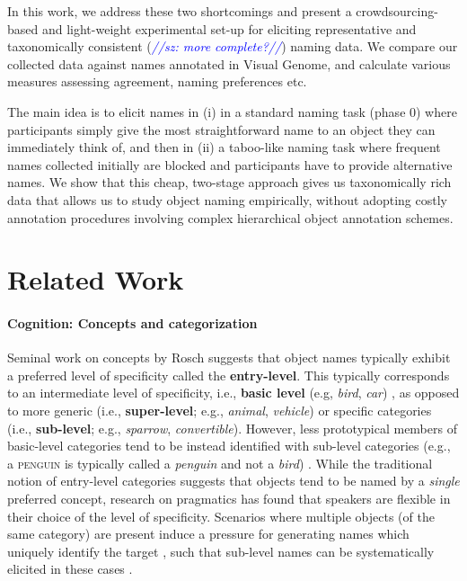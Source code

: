 \documentclass[11pt]{article}
\newcommand{\sz}[1]{\textcolor{blue}{\emph{//sz: #1//}}}
\newcommand{\refexp}[1]{\textsl{#1}}
\newcommand{\cat}[1]{\textsc{#1}}
\begin{document}
In this work, we address these two shortcomings and present a crowdsourcing-based and light-weight experimental set-up for eliciting representative and taxonomically consistent (\sz{more complete?}) naming data. We compare our collected data against names annotated in Visual Genome, and calculate various measures assessing agreement, naming preferences etc.

The main idea is to elicit names in (i) in a standard naming task (phase 0) where participants simply give the most straightforward name to an object they can immediately think of, and then in (ii) a taboo-like naming task where frequent names collected initially are blocked and participants have to provide alternative names. We show that this cheap, two-stage approach gives us taxonomically rich data that allows us to study object naming empirically, without adopting costly annotation procedures involving complex hierarchical object annotation schemes.


\section{Related Work}
\label{sec:related}

\paragraph{Cognition: Concepts and categorization}

 Seminal work on concepts by Rosch suggests that object names typically exhibit a preferred level of specificity called the \textbf{entry-level}. This typically corresponds to an intermediate level of specificity, i.e., \textbf{basic level} (e.g, \refexp{bird}, \refexp{car}) \cite{rosch1976basic}, as opposed to more generic (i.e., \textbf{super-level}; e.g., \refexp{animal}, \refexp{vehicle}) or specific categories (i.e., \textbf{sub-level}; e.g., \refexp{sparrow}, \refexp{convertible}). However, less prototypical members of basic-level categories tend to be instead identified with sub-level categories (e.g., a \cat{penguin} is typically called a \refexp{penguin} and not a \refexp{bird}) \cite{jolicoeur1984pictures}. 
While the traditional notion of entry-level categories suggests that objects tend to be named by a \refexp{single} preferred concept, research on pragmatics has found that speakers are flexible in  
their choice of the level of specificity. 
Scenarios where multiple objects (of the same category) are present induce a pressure for generating names which uniquely identify the target \cite{olson1970language}, such that sub-level names can be systematically elicited in these cases %
\cite{rohde2012communicating}\cite{graf2016animal}.
\end{document}
